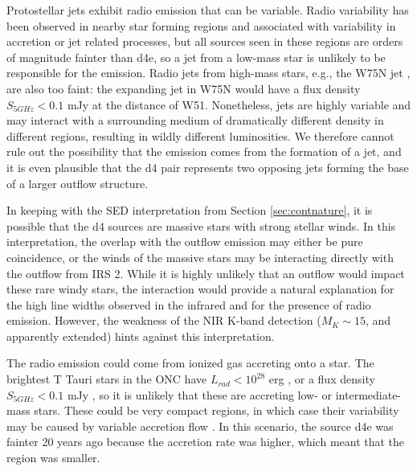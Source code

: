 Protostellar jets exhibit radio emission that can be variable.  Radio
variability has been observed in nearby star forming regions
\citep{Liu2014c,Forbrich2013a} and associated with variability in accretion or
jet related processes, but all sources seen in these regions are orders of
magnitude fainter than d4e, so a jet from a low-mass star is unlikely to be
responsible for the emission.  Radio jets from high-mass stars, e.g., the W75N
jet \citep{Carrasco-Gonzalez2015a}, are also too faint: the expanding jet in
W75N would have a flux density $S_{5 GHz} < 0.1$ mJy at the distance of W51.
Nonetheless, jets are highly variable and may interact with a surrounding
medium of dramatically different density in different regions, resulting in
wildly different luminosities.  We therefore cannot rule out the possibility
that the emission comes from the formation of a jet, and it is even plausible
that the d4 pair represents two opposing jets forming the base of a larger
outflow structure.

In keeping with the SED interpretation from Section \ref{sec:contnature}, it is
possible that the d4 sources are massive stars with strong stellar winds.  In
this interpretation, the overlap with the outflow emission may either be pure
coincidence, or the winds of the massive stars may be interacting directly with
the outflow from IRS 2.  While it is highly unlikely that an outflow would
impact these rare windy stars, the interaction would provide a natural
explanation for the high line widths observed in the infrared and for the
presence of radio emission.  However, the weakness of the NIR K-band detection
($M_K \sim 15$, and apparently extended) hints against this interpretation.

The radio emission could come from ionized gas accreting onto a star.  The
brightest T Tauri stars in the ONC have $L_{rad}<10^{28}$ erg \pers, or a flux
density $S_{5 GHz} < 0.1$ mJy \citep{Forbrich2013a,Zapata2004a}, so it is
unlikely that these are accreting low- or intermediate- mass stars.  These
could be very compact \hchii regions, in which case their variability may be
caused by variable accretion flow \citep{Peters2010c}.  In this scenario,
the source d4e was fainter 20 years ago because the accretion rate was higher,
which meant that the \hchii region was smaller.

